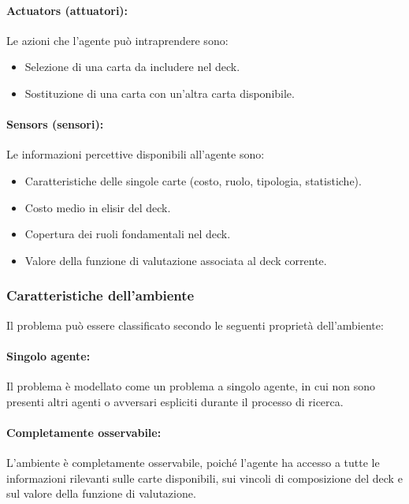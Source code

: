 \documentclass{article}
\begin{document}
\paragraph{Actuators (attuatori):}
Le azioni che l’agente può intraprendere sono:
\begin{itemize}
    \item Selezione di una carta da includere nel deck.
    \item Sostituzione di una carta con un’altra carta disponibile.
\end{itemize}

\paragraph{Sensors (sensori):}
Le informazioni percettive disponibili all’agente sono:
\begin{itemize}
    \item Caratteristiche delle singole carte (costo, ruolo, tipologia, statistiche).
    \item Costo medio in elisir del deck.
    \item Copertura dei ruoli fondamentali nel deck.
    \item Valore della funzione di valutazione associata al deck corrente.
\end{itemize}

\subsubsection{Caratteristiche dell’ambiente}

Il problema può essere classificato secondo le seguenti proprietà dell’ambiente:

\paragraph{Singolo agente:}
Il problema è modellato come un problema a singolo agente, in cui non sono presenti altri agenti o avversari espliciti durante il processo di ricerca.

\paragraph{Completamente osservabile:}
L’ambiente è completamente osservabile, poiché l’agente ha accesso a tutte le informazioni rilevanti sulle carte disponibili, sui vincoli di composizione del deck e sul valore della funzione di valutazione.
\end{document}
